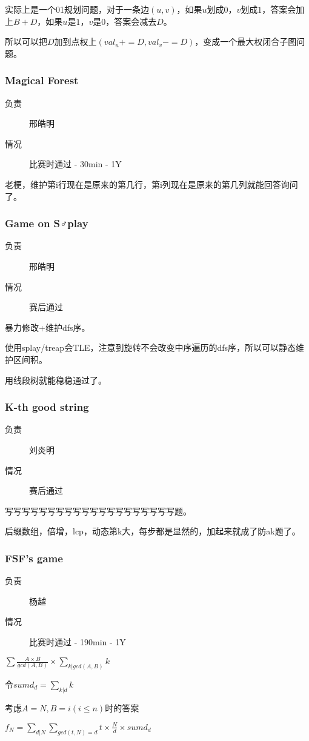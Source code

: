 \documentclass[a4paper, 11pt, nofonts, nocap, fancyhdr]{ctexart}
\newcommand{\problem}[1]{\subsubsection{#1}}
\begin{document}
实际上是一个01规划问题，对于一条边$(u,v)$，如果$u$划成$0$，$v$划成$1$，答案会加上$B+D$，如果$u$是$1$，$v$是$0$，答案会减去$D$。

所以可以把$D$加到点权上$(val_u += D, val_v -= D)$，变成一个最大权闭合子图问题。

\problem{Magical Forest}

\begin{description}
\item[负责] 邢皓明
\item[情况] 比赛时通过 - 30min - 1Y
\end{description}

老梗，维护第i行现在是原来的第几行，第i列现在是原来的第几列就能回答询问了。

\problem{Game on S♂play}

\begin{description}
\item[负责] 邢皓明
\item[情况] 赛后通过
\end{description}

暴力修改+维护dfs序。

使用splay/treap会TLE，注意到旋转不会改变中序遍历的dfs序，所以可以静态维护区间积。

用线段树就能稳稳通过了。

\problem{K-th good string}

\begin{description}
\item[负责] 刘炎明
\item[情况] 赛后通过
\end{description}

写写写写写写写写写写写写写写写写写写写写题。

后缀数组，倍增，lcp，动态第k大，每步都是显然的，加起来就成了防ak题了。

\problem{FSF’s game}

\begin{description}
\item[负责] 杨越
\item[情况] 比赛时通过 - 190min - 1Y
\end{description}

$\sum \frac{A\times B}{gcd(A,B)}\times\sum\limits_{k|gcd(A,B)} k$

令$sumd_d = \sum\limits_{k|d} k$

考虑$A=N, B=i(i \leq n)$时的答案

$f_N = \sum\limits_{d|N} \sum\limits_{gcd(t, N) = d} t \times \frac{N}{d} \times sumd_d$
\end{document}
